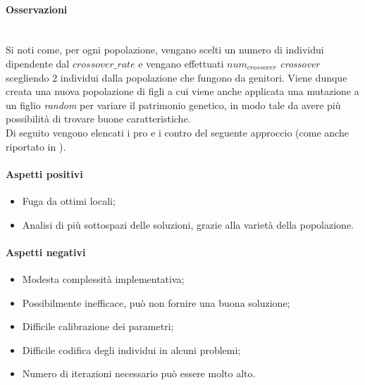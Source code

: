 \noindent \paragraph{Osservazioni}\hfill\\
Si noti come, per ogni popolazione, vengano scelti un numero di individui dipendente dal {$crossover\_rate$}
e vengano effettuati {$num_{crossover}$} \textit{crossover} scegliendo 2 individui dalla popolazione che fungono da genitori.
Viene dunque creata una nuova popolazione di figli a cui viene anche applicata una mutazione a un figlio \textit{random} per
variare il patrimonio genetico, in modo tale da avere più possibilità di trovare buone caratteristiche.\\
Di seguito vengono elencati i pro e i contro del seguente approccio (come anche riportato in \cite{site:articolo-alg-gen} \cite{site:paper-lo-go}).\\

\noindent \paragraph{Aspetti positivi}
\begin{itemize}
    \item Fuga da ottimi locali;
    \item Analisi di più sottospazi delle soluzioni, grazie alla varietà della popolazione.
\end{itemize}

\noindent \paragraph{Aspetti negativi}
\begin{itemize}
    \item Modesta complessità implementativa;
    \item Possibilmente inefficace, può non fornire una buona soluzione;
    \item Difficile calibrazione dei parametri;
    \item Difficile codifica degli individui in alcuni problemi;
    \item Numero di iterazioni necessario può essere molto alto.
\end{itemize}
\newpage
